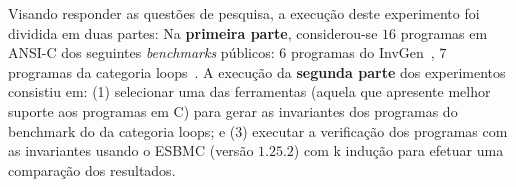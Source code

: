 Visando responder as questões de pesquisa, a execução deste experimento foi dividida em duas partes: Na \textbf{primeira parte}, considerou-se $16$ programas em ANSI-C dos seguintes \textit{benchmarks} públicos: $6$ programas do InvGen~\cite{SurveySymExec-CSUR:2018}, $7$ programas da categoria loops~\cite{Cordeiro_ecs_2011}. 
%
A execução da \textbf{segunda parte} dos experimentos consistiu em: (1) selecionar uma das ferramentas
(aquela que apresente melhor suporte aos programas em C) para gerar as invariantes dos programas do benchmark do da categoria loops; e (3) executar a verificação dos programas com as invariantes usando o ESBMC (versão $1.25.2$) com k indução para efetuar uma comparação dos resultados.
